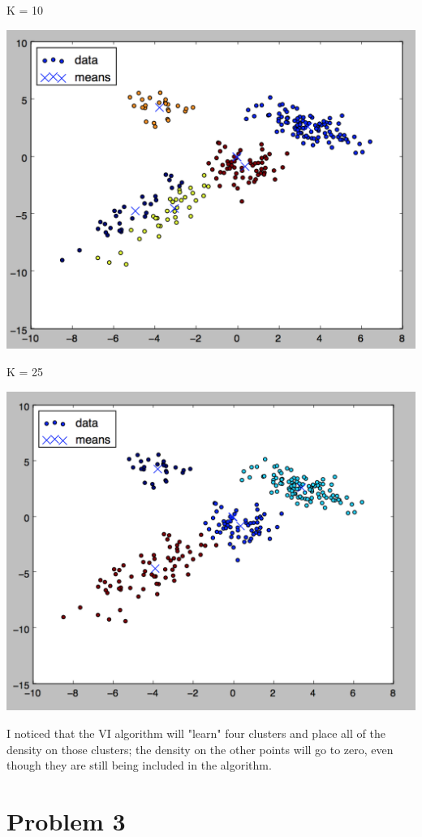 \documentclass[twoside,11pt]{homework}
\begin{document}
K = 10

\includegraphics[scale=.5]{images/vi_10_plot.png}

K = 25

\includegraphics[scale=.5]{images/vi_25_plot.png}

I noticed that the VI algorithm will "learn" four clusters and place all of the density on those clusters; the density on the other points will go to zero, even though they are still being included in the algorithm.

\section*{Problem 3}
\end{document}

